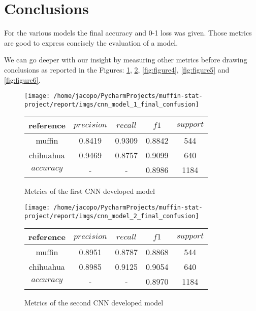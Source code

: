 \section{Conclusions}\label{sec:conclusions}

For the various models the final accuracy and 0-1 loss was given.
Those metrics are good to express concisely the evaluation of a model.

We can go deeper with our insight by measuring other metrics before drawing conclusions as reported in the Figures: \ref{fig:figure2}, \ref{fig:figure3}, \ref{fig:figure4}, \ref{fig:figure5} and \ref{fig:figure6}.



\begin{figure}
    \centering
    \texttt{[image: /home/jacopo/PycharmProjects/muffin-stat-project/report/imgs/cnn\_model\_1\_final\_confusion]}
    \begin{tabular}{ c | c | c | c| c}
        \hline
        reference  & $precision$ & $recall$ & $f1$   & $support$ \\
        \hline\hline
        muffin     & 0.8419      & 0.9309   & 0.8842 & 544       \\
        \hline
        chihuahua  & 0.9469      & 0.8757   & 0.9099 & 640       \\
        \hline
        $accuracy$ & -           & -        & 0.8986 & 1184      \\
        \hline
    \end{tabular}
    \caption{
        Metrics of the first CNN developed model
    }\label{fig:figure2}
\end{figure}


\begin{figure}
    \centering
    \texttt{[image: /home/jacopo/PycharmProjects/muffin-stat-project/report/imgs/cnn\_model\_2\_final\_confusion]}
    \begin{tabular}{ c | c | c | c| c}
        \hline
        reference  & $precision$ & $recall$ & $f1$   & $support$ \\
        \hline\hline
        muffin     & 0.8951      & 0.8787   & 0.8868 & 544       \\
        \hline
        chihuahua  & 0.8985      & 0.9125   & 0.9054 & 640       \\
        \hline
        $accuracy$ & -           & -        & 0.8970 & 1184      \\
        \hline
    \end{tabular}
    \caption{
        Metrics of the second CNN developed model
    }\label{fig:figure3}
\end{figure}


